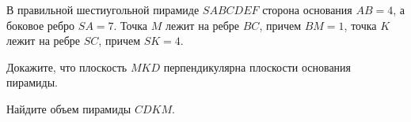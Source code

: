 \begin{ex}
	\begin{condition}
		В правильной шестиугольной пирамиде \( SABCDEF \) сторона основания \( AB = 4 \), а боковое ребро \( SA = 7 \). Точка \( M \) лежит на ребре \( BC \), причем \( BM = 1 \), точка \( K \) лежит на ребре \( SC \), причем \( SK = 4 \).
		\begin{enumcols}[label=\asbuk*)]
			\item Докажите, что плоскость \( MKD \) перпендикулярна плоскости основания пирамиды.
			\item Найдите объем пирамиды \( CDKM \).
		\end{enumcols}
	\end{condition}
\end{ex}